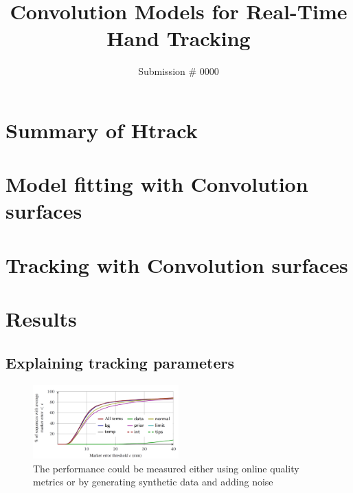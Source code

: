 \documentclass[tog]{acmsiggraph}
\title{Convolution Models for Real-Time Hand Tracking}
\author{Submission \# 0000}
\begin{document}
\maketitle


% 
% 
% 
% 

\section{Summary of Htrack}
\section{Model fitting with Convolution surfaces}
\section{Tracking with Convolution surfaces}
\section{Results}

\subsection{Explaining tracking parameters}
\begin{figure}[h!] 
	\centering
	\includegraphics[width=0.5\textwidth]{fig/draft/draft_explaining_parameters}
	\caption{The performance could be measured either using online quality metrics or by generating synthetic data and adding noise}
	\label{fig:modeling}
\end{figure}
\end{document}
